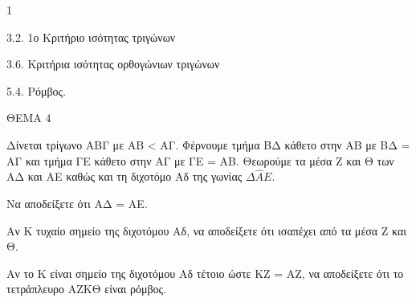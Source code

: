\begin{ylh}{1}
    \item 3.2. 1ο Κριτήριο ισότητας τριγώνων
    \item 3.6. Κριτήρια ισότητας ορθογώνιων τριγώνων
    \item 5.4. Ρόμβος.
\end{ylh}

ΘΕΜΑ 4

Δίνεται τρίγωνο ΑΒΓ με ΑΒ \textless{} ΑΓ. Φέρνουμε τμήμα ΒΔ κάθετο στην ΑΒ με ΒΔ = ΑΓ και τμήμα ΓΕ κάθετο στην ΑΓ με ΓΕ = ΑΒ. Θεωρούμε τα μέσα Ζ και Θ των ΑΔ και ΑΕ καθώς και τη διχοτόμο Αδ της γωνίας $\Delta\widehat{Α}Ε$.

\begin{alist}
\item Να αποδείξετε ότι ΑΔ = ΑΕ. 

\item Αν Κ τυχαίο σημείο της διχοτόμου Αδ, να αποδείξετε ότι ισαπέχει από τα μέσα Ζ και Θ. 

\item Αν το Κ είναι σημείο της διχοτόμου Αδ τέτοιο ώστε ΚΖ = ΑΖ, να αποδείξετε ότι το τετράπλευρο ΑΖΚΘ είναι ρόμβος. 


\end{alist}
